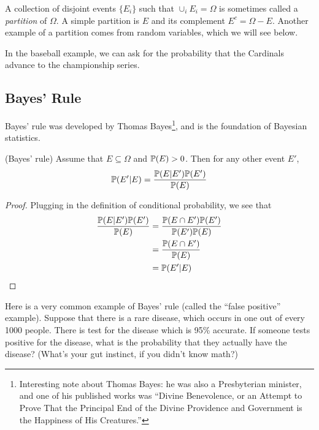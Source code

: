 \documentclass{ximera}
\begin{document}
A collection of disjoint events $\{E_i\}$ such that $\cup_i E_i = \Omega$ is sometimes called a \textit{partition} of $\Omega$. A simple partition is $E$ and its complement $E^c= \Omega - E$. Another example of a partition comes from random variables, which we will see below.

In the baseball example, we can ask for the probability that the Cardinals advance to the championship series. 

\subsection{Bayes' Rule}
Bayes' rule was developed by Thomas Bayes\footnote{Interesting note about Thomas Bayes: he was also a Presbyterian minister, and one of his published works was ``Divine Benevolence, or an Attempt to Prove That the Principal End of the Divine Providence and Government is the Happiness of His Creatures.''}, and is the foundation of Bayesian statistics.

\begin{theorem} (Bayes' rule)
Assume that $E\subseteq \Omega$ and $\mathbb{P}(E)>0$. Then for any other event $E'$,
$$
\mathbb{P}(E'\vert E) = \frac{\mathbb{P}(E\vert E') \mathbb{P}(E')}{\mathbb{P}(E)}
$$
\end{theorem}
\begin{proof}
Plugging in the definition of conditional probability, we see that
\begin{align*}
 \frac{\mathbb{P}(E\vert E') \mathbb{P}(E')}{\mathbb{P}(E)} &= \frac{\mathbb{P}(E \cap E') \mathbb{P}(E')}{ \mathbb{P}(E') \mathbb{P}(E)} \\
&=\frac{\mathbb{P}(E \cap E')}{\mathbb{P}(E)} \\
&= \mathbb{P}(E'\vert E) 
\end{align*}
\end{proof}

Here is a very common example of Bayes' rule (called the ``false positive'' example). Suppose that there is a rare disease, which occurs in one out of every 1000 people. There is test for the disease which is 95\% accurate. If someone tests positive for the disease, what is the probability that they actually have the disease? (What's your gut instinct, if you didn't know math?)
\end{document}
